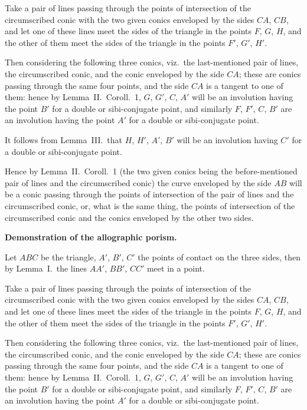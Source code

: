 \documentclass[12pt,a4paper]{article}
\theoremstyle{plain}
\theoremstyle{definition}
\begin{document}
Take a pair of lines passing through the points of intersection of the circumscribed conic with the two given conics enveloped by the sides $CA$, $CB$, and let one of these lines meet the sides of the triangle in the points $F$, $G$, $H$, and the other of them meet the sides of the triangle in the points $F'$, $G'$, $H'$.

Then considering the following three conics, viz.\ the last-mentioned pair of lines, the circumscribed conic, and the conic enveloped by the side $CA$; these are conics passing through the same four points, and the side $CA$ is a tangent to one of them: hence by Lemma~II.\ Coroll.~1, $G$, $G'$, $C$, $A'$ will be an involution having the point $B'$ for a double or sibi-conjugate point, and similarly $F$, $F'$, $C$, $B'$ are an involution having the point $A'$ for a double or sibi-conjugate point.

It follows from Lemma~III.\ that $H$, $H'$, $A'$, $B'$ will be an involution having $C'$ for a double or sibi-conjugate point.

Hence by Lemma~II.\ Coroll.~1 (the two given conics being the before-mentioned pair of lines and the circumscribed conic) the curve enveloped by the side $AB$ will be a conic passing through the points of intersection of the pair of lines and the circumscribed conic, or, what is the same thing, the points of intersection of the circumscribed conic and the conics enveloped by the other two sides.

\textbf{Demonstration of the allographic porism.}

Let $ABC$ be the triangle, $A'$, $B'$, $C'$ the points of contact on the three sides, then by Lemma~I.\ the lines $AA'$, $BB'$, $CC'$ meet in a point.

Take a pair of lines passing through the points of intersection of the circumscribed conic with the two given conics enveloped by the sides $CA$, $CB$, and let one of these lines meet the sides of the triangle in the points $F$, $G$, $H$, and the other of them meet the sides of the triangle in the points $F'$, $G'$, $H'$.

Then considering the following three conics, viz.\ the last-mentioned pair of lines, the circumscribed conic, and the conic enveloped by the side $CA$; these are conics passing through the same four points, and the side $CA$ is a tangent to one of them: hence by Lemma~II.\ Coroll.~1, $G$, $G'$, $C$, $A'$ will be an involution having the point $B'$ for a double or sibi-conjugate point, and similarly $F$, $F'$, $C$, $B'$ are an involution having the point $A'$ for a double or sibi-conjugate point.
\end{document}

